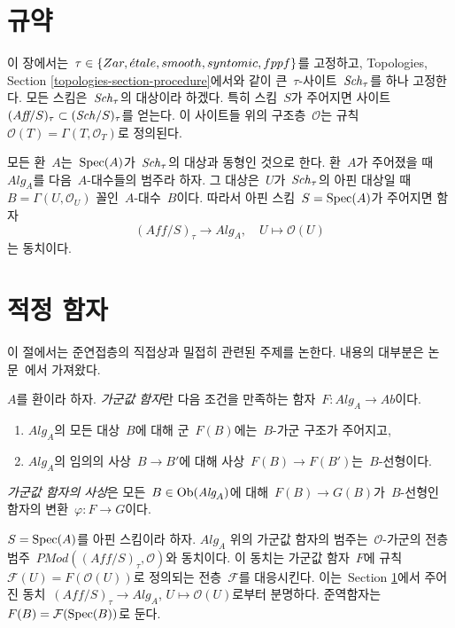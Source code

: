 \section{규약}
\label{section-conventions}

\noindent
이 장에서는\ 
$\tau \in \{Zar, {\acute{e}tale}, smooth, syntomic, fppf\}$를 고정하고,
Topologies, Section \ref{topologies-section-procedure}에서와 같이
큰\  $\tau$-사이트\  $\mathit{Sch}_\tau$를 하나 고정한다. 모든 스킴은\ 
$\mathit{Sch}_\tau$의 대상이라 하겠다. 특히 스킴\  $S$가 주어지면 사이트\ 
$(\textit{Aff}/S)_\tau \subset (\mathit{Sch}/S)_\tau$를 얻는다.
이 사이트들 위의 구조층\  $\mathcal{O}$는 규칙\ 
$\mathcal{O}(T) = \Gamma(T, \mathcal{O}_T)$로 정의된다.

\medskip\noindent
모든 환\  $A$는\  $\mathop{\mathrm{Spec}}(A)$가\  $\mathit{Sch}_\tau$의 대상과 동형인
것으로 한다. 환\  $A$가 주어졌을 때\  $\textit{Alg}_A$를 다음\ 
$A$-대수들의 범주라 하자. 그 대상은\  $U$가\  $\mathit{Sch}_\tau$의
아핀 대상일 때\  $B = \Gamma(U, \mathcal{O}_U)$ 꼴인\ 
$A$-대수\  $B$이다. 따라서 아핀 스킴\  $S = \mathop{\mathrm{Spec}}(A)$가 주어지면
함자
$$
(\textit{Aff}/S)_\tau \longrightarrow \textit{Alg}_A,
\quad
U \longmapsto \mathcal{O}(U)
$$
는 동치이다.







\section{적정 함자}
\label{section-quasi-coherent}

\noindent
이 절에서는 준연접층의 직접상과 밀접히 관련된 주제를 논한다.
내용의 대부분은 논문\  \cite{Jaffe}에서 가져왔다.

\begin{definition}
\label{definition-module-valued-functor}
$A$를 환이라 하자. {\it 가군값 함자}란 다음 조건을 만족하는 함자\ 
$F : \textit{Alg}_A \to \textit{Ab}$이다.
\begin{enumerate}
\item $\textit{Alg}_A$의 모든 대상\  $B$에 대해 군\  $F(B)$에는\ 
$B$-가군 구조가 주어지고,
\item $\textit{Alg}_A$의 임의의 사상\  $B \to B'$에 대해 사상\ 
$F(B) \to F(B')$는\  $B$-선형이다.
\end{enumerate}
{\it 가군값 함자의 사상}은 모든\  $B \in \mathop{\mathrm{Ob}}\nolimits(\textit{Alg}_A)$에
대해\  $F(B) \to G(B)$가\  $B$-선형인 함자의 변환\ 
$\varphi : F \to G$이다.
\end{definition}

\noindent
$S = \mathop{\mathrm{Spec}}(A)$를 아핀 스킴이라 하자.
$\textit{Alg}_A$ 위의 가군값 함자의 범주는\ 
$\mathcal{O}$-가군의 전층 범주\ 
$\textit{PMod}((\textit{Aff}/S)_\tau, \mathcal{O})$와 동치이다.
이 동치는 가군값 함자\  $F$에 규칙\ 
$\mathcal{F}(U) = F(\mathcal{O}(U))$로 정의되는 전층\ 
$\mathcal{F}$를 대응시킨다. 이는\  Section
\ref{section-conventions}에서 주어진 동치\ 
$(\textit{Aff}/S)_\tau \to \textit{Alg}_A$,
$U \mapsto \mathcal{O}(U)$로부터 분명하다.
준역함자는\  $F(B) = \mathcal{F}(\mathop{\mathrm{Spec}}(B))$로 둔다.

